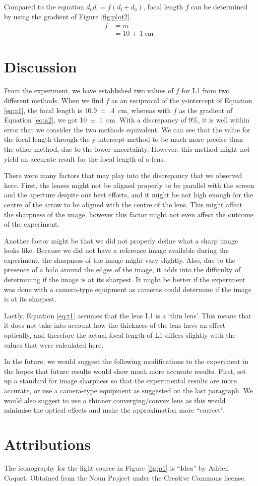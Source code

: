 \documentclass[letter,12pt]{article}
\numberwithin{equation}{section}
\numberwithin{figure}{section}
\numberwithin{table}{section}
\newcommand{\mdist}[1] {d_{\mathrm{#1}}}
\begin{document}
Compared to the equation \(\mdist{o} \mdist{i} = f(\mdist{i} + \mdist{o})\), focal length \(f\) can be determined by using the  gradient of Figure \ref{fig:plot2}. 
\begin{align*}
  f &= m \\
  &= \SI{10(1)}{\cm}
\end{align*}

\section{Discussion}
From the experiment, we have established two values of \(f\) for L1 from two different methods. When we find \(f\) as an reciprocal of the y-intercept of Equation \ref{eq:a1}, the focal length is \SI{10.9(4)}{\cm}, whereas with \(f\) as the gradient of Equation \ref{eq:a2}, we got \SI{10(1)}{\cm}. With a discrepancy of 9\%, it is well within error that we consider the two methods equivalent. We can see that the value for the focal length through the y-intercept method to be much more precise than the other method, due to the lower uncertainty. However, this method might not yield an accurate result for the focal length of a lens.

There were many factors that may play into the discrepancy that we observed here. First, the lenses might not be aligned properly to be parallel with the screen and the aperture despite our best efforts, and it might be not high enough for the centre of the arrow to be aligned with the centre of the lens. This might affect the sharpness of the image, however this factor might not even affect the outcome of the experiment.

Another factor might be that we did not properly define what a sharp image looks like. Because we did not have a reference image available during the experiment, the sharpness of the image might vary slightly. Also, due to the presence of a halo around the edges of the image, it adds into the difficulty of determining if the image is at its sharpest. It might be better if the experiment was done with a camera-type equipment as cameras could determine if the image is at its sharpest.

Lastly, Equation \ref{eq:t1} assumes that the lens L1 is a ‘thin lens’. This means that it does not take into account how the thickness of the lens have an effect optically, and therefore the actual focal length of L1 differs slightly with the values that were calculated here.

In the future, we would suggest the following modifications to the experiment in the hopes that future results would show much more accurate results. First, set up a standard for image sharpness so that the experimental results are more accurate, or use a camera-type equipment as suggested on the last paragraph. We would also suggest to use a thinner converging/convex lens as this would minimise the optical effects and make the approximation more ``correct''.


\section{Attributions}
The iconography for the light source in Figure \ref{fig:p1} is ``Idea'' by Adrien Coquet. Obtained from the Noun Project under the Creative Commons license.
\end{document}
